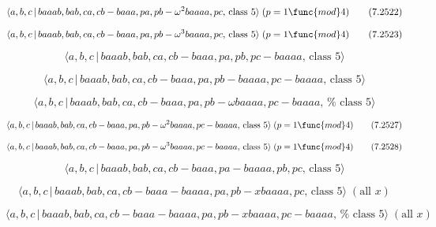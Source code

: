 \documentclass[10pt]{article}
\begin{document}
\begin{equation}
\langle a,b,c\,|\,baaab,bab,ca,cb-baaa,pa,pb-\omega ^{2}baaaa,pc,\,\text{%
class }5\rangle \;(p=1\func{mod}4)  \tag{7.2522}
\end{equation}

\begin{equation}
\langle a,b,c\,|\,baaab,bab,ca,cb-baaa,pa,pb-\omega ^{3}baaaa,pc,\,\text{%
class }5\rangle \;(p=1\func{mod}4)  \tag{7.2523}
\end{equation}

\begin{equation}
\langle a,b,c\,|\,baaab,bab,ca,cb-baaa,pa,pb,pc-baaaa,\,\text{class }5\rangle
\tag{7.2524}
\end{equation}

\begin{equation}
\langle a,b,c\,|\,baaab,bab,ca,cb-baaa,pa,pb-baaaa,pc-baaaa,\,\text{class }%
5\rangle  \tag{7.2525}
\end{equation}

\begin{equation}
\langle a,b,c\,|\,baaab,bab,ca,cb-baaa,pa,pb-\omega baaaa,pc-baaaa,\,\text{%
class }5\rangle  \tag{7.2526}
\end{equation}

\begin{equation}
\langle a,b,c\,|\,baaab,bab,ca,cb-baaa,pa,pb-\omega ^{2}baaaa,pc-baaaa,\,%
\text{class }5\rangle \;(p=1\func{mod}4)  \tag{7.2527}
\end{equation}

\begin{equation}
\langle a,b,c\,|\,baaab,bab,ca,cb-baaa,pa,pb-\omega ^{3}baaaa,pc-baaaa,\,%
\text{class }5\rangle \;(p=1\func{mod}4)  \tag{7.2528}
\end{equation}

\begin{equation}
\langle a,b,c\,|\,baaab,bab,ca,cb-baaa,pa-baaaa,pb,pc,\,\text{class }5\rangle
\tag{7.2529}
\end{equation}

\begin{equation}
\langle a,b,c\,|\,baaab,bab,ca,cb-baaa-baaaa,pa,pb-xbaaaa,pc,\,\text{class }%
5\rangle \;(\text{all }x)  \tag{7.2530}
\end{equation}

\begin{equation}
\langle a,b,c\,|\,baaab,bab,ca,cb-baaa-baaaa,pa,pb-xbaaaa,pc-baaaa,\,\text{%
class }5\rangle \;(\text{all }x)  \tag{7.2531}
\end{equation}
\end{document}

